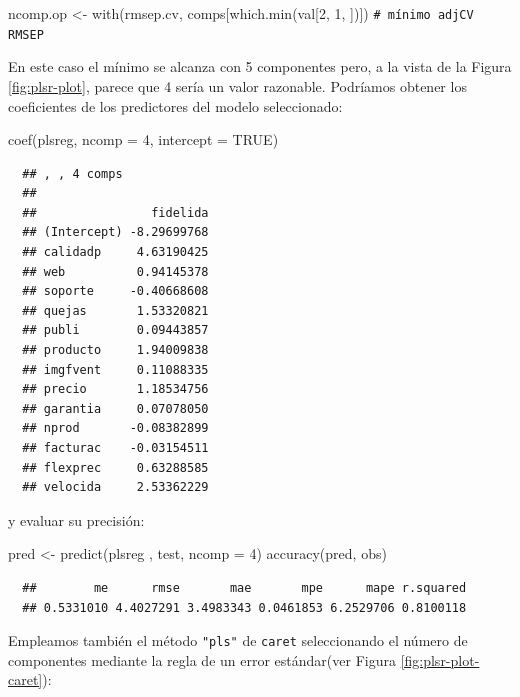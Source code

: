 \documentclass[
]{book}
\newenvironment{Shaded}{\begin{snugshade}}{\end{snugshade}}
\newcommand{\AttributeTok}[1]{\textcolor[rgb]{0.77,0.63,0.00}{#1}}
\newcommand{\CommentTok}[1]{\textcolor[rgb]{0.56,0.35,0.01}{\textit{#1}}}
\newcommand{\ConstantTok}[1]{\textcolor[rgb]{0.00,0.00,0.00}{#1}}
\newcommand{\DecValTok}[1]{\textcolor[rgb]{0.00,0.00,0.81}{#1}}
\newcommand{\FunctionTok}[1]{\textcolor[rgb]{0.00,0.00,0.00}{#1}}
\newcommand{\NormalTok}[1]{#1}
\newcommand{\OtherTok}[1]{\textcolor[rgb]{0.56,0.35,0.01}{#1}}
\theoremstyle{break}
\theoremstyle{nonumberplain}
\renewcommand{\CommentTok}[1]{\textcolor[rgb]{0.41,0.41,0.41}{\texttt{#1}}}
\begin{document}
\begin{Shaded}
\begin{Highlighting}[]
\NormalTok{ncomp.op }\OtherTok{\textless{}{-}} \FunctionTok{with}\NormalTok{(rmsep.cv, comps[}\FunctionTok{which.min}\NormalTok{(val[}\DecValTok{2}\NormalTok{, }\DecValTok{1}\NormalTok{, ])]) }\CommentTok{\# mínimo adjCV RMSEP}
\end{Highlighting}
\end{Shaded}

En este caso el mínimo se alcanza con 5 componentes pero, a la vista de la Figura \ref{fig:plsr-plot}, parece que 4 sería un valor razonable.
Podríamos obtener los coeficientes de los predictores del modelo seleccionado:

\begin{Shaded}
\begin{Highlighting}[]
\FunctionTok{coef}\NormalTok{(plsreg, }\AttributeTok{ncomp =} \DecValTok{4}\NormalTok{, }\AttributeTok{intercept =} \ConstantTok{TRUE}\NormalTok{)}
\end{Highlighting}
\end{Shaded}

\begin{verbatim}
  ## , , 4 comps
  ## 
  ##                fidelida
  ## (Intercept) -8.29699768
  ## calidadp     4.63190425
  ## web          0.94145378
  ## soporte     -0.40668608
  ## quejas       1.53320821
  ## publi        0.09443857
  ## producto     1.94009838
  ## imgfvent     0.11088335
  ## precio       1.18534756
  ## garantia     0.07078050
  ## nprod       -0.08382899
  ## facturac    -0.03154511
  ## flexprec     0.63288585
  ## velocida     2.53362229
\end{verbatim}

y evaluar su precisión:

\begin{Shaded}
\begin{Highlighting}[]
\NormalTok{pred }\OtherTok{\textless{}{-}} \FunctionTok{predict}\NormalTok{(plsreg , test, }\AttributeTok{ncomp =} \DecValTok{4}\NormalTok{)}
\FunctionTok{accuracy}\NormalTok{(pred, obs)}
\end{Highlighting}
\end{Shaded}

\begin{verbatim}
  ##        me      rmse       mae       mpe      mape r.squared 
  ## 0.5331010 4.4027291 3.4983343 0.0461853 6.2529706 0.8100118
\end{verbatim}

Empleamos también el método \texttt{"pls"} de \texttt{caret} seleccionando el número de componentes mediante la regla de un error estándar(ver Figura \ref{fig:plsr-plot-caret}):
\end{document}
